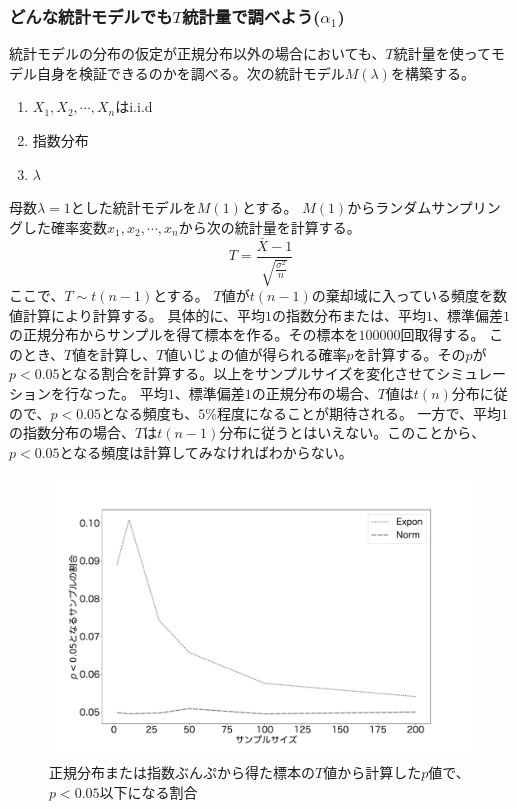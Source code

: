 \subsubsection{どんな統計モデルでも$T$統計量で調べよう($\alpha_1$)}
統計モデルの分布の仮定が正規分布以外の場合においても、$T$統計量を使ってモデル自身を検証できるのかを調べる。次の統計モデル$M(\lambda)$を構築する。
\begin{enumerate}
    \item $X_1,X_2,\cdots,X_n $はi.i.d
    \item 指数分布
    \item $\lambda$
\end{enumerate}
母数$\lambda=1$とした統計モデルを$M(1)$とする。
$M(1)$からランダムサンプリングした確率変数$x_1,x_2,\cdots,x_n$から次の統計量を計算する。
\begin{equation*}
    T = \frac{\bar{X}-1}{\sqrt{\frac{\sigma^2}{n}}}
\end{equation*}
ここで、$T \sim t(n-1)$とする。
$T$値が$t(n-1)$の棄却域に入っている頻度を数値計算により計算する。
具体的に、平均$1$の指数分布または、平均$1$、標準偏差$1$の正規分布からサンプルを得て標本を作る。その標本を$100000$回取得する。
このとき、$T$値を計算し、$T$値いじょの値が得られる確率$p$を計算する。その$p$が$p<0.05$となる割合を計算する。以上をサンプルサイズを変化させてシミュレーションを行なった。
平均$1$、標準偏差$1$の正規分布の場合、$T$値は$t(n)$分布に従ので、$p<0.05$となる頻度も、$5\%$程度になることが期待される。
一方で、平均$1$の指数分布の場合、$T$は$t(n-1)$分布に従うとはいえない。このことから、$p<0.05$となる頻度は計算してみなければわからない。


\begin{figure}
    \begin{center}
        \includegraphics[width=15cm]{./image/04_/t_test_expon_norm.pdf}
        \caption{正規分布または指数ぶんぷから得た標本の$T$値から計算した$p$値で、$p<0.05$以下になる割合}
    \end{center}
\end{figure}

